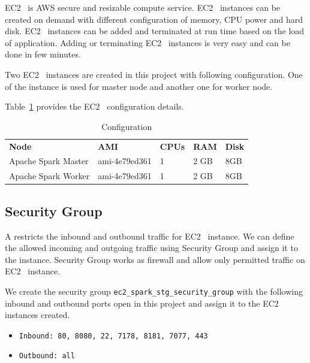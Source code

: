 EC2~\cite{hid-sp18-511-www-ec2} is AWS secure and resizable compute
service. EC2~\cite{hid-sp18-511-www-ec2} instances can be created on
demand with different configuration of memory, CPU power and hard
disk. EC2~\cite{hid-sp18-511-www-ec2} instances can be added and
terminated at run time based on the load of application. Adding or
terminating EC2~\cite{hid-sp18-511-www-ec2} instances is very easy and
can be done in few minutes.

Two EC2~\cite{hid-sp18-511-www-ec2} instances are created in this
project with following configuration. One of the instance is used for
master node and another one for worker node.

Table~\ref{t:ec2-configuration} provides the
EC2~\cite{hid-sp18-511-www-ec2} configuration details.

\begin{table}[]
	\centering \caption{Configuration}\label{t:ec2-configuration}
  \begin{tabular}{lllll} \textbf{Node}
	& \textbf{AMI} & \textbf{CPUs} & \textbf{RAM}
	& \textbf{Disk}\\ Apache Spark Master & ami-4e79ed361 & 1 & 2
	GB & 8GB\\ Apache Spark Worker & ami-4e79ed361 & 1 & 2 GB & 8GB\\ 
  \end{tabular}
\end{table}

\subsection{Security Group}

A  restricts the inbound and outbound traffic for
EC2~\cite{hid-sp18-511-www-ec2} instance.  We can define the allowed
incoming and outgoing traffic using Security Group and assign it to
the instance. Security Group works as firewall and allow only
permitted traffic on EC2~\cite{hid-sp18-511-www-ec2} instance.

We create the security group \verb|ec2_spark_stg_security_group| with the
following inbound and outbound ports open in this project and assign
it to the EC2~\cite{hid-sp18-511-www-ec2} instances created.

\begin{itemize}
	\item \verb|Inbound: 80, 8080, 22, 7178, 8181, 7077, 443|
	\item \verb|Outbound: all|
	
\end{itemize}

